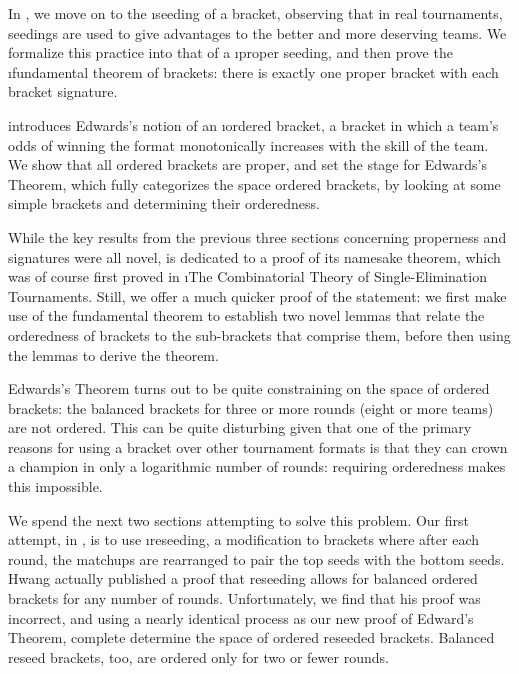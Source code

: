 {    In , we move on to the \i{seeding} of a bracket, observing that in real tournaments, seedings are used to give advantages to the better and more deserving teams. We formalize this practice into that of a \i{proper seeding}, and then prove the \i{fundamental theorem of brackets}: there is exactly one proper bracket with each bracket signature.

     introduces Edwards's \cite{montana} notion of an \i{ordered bracket}, a bracket in which a team's odds of winning the format monotonically increases with the skill of the team. We show that all ordered brackets are proper, and set the stage for Edwards's Theorem, which fully categorizes the space ordered brackets, by looking at some simple brackets and determining their orderedness.

    While the key results from the previous three sections concerning properness and signatures were all novel,  is dedicated to a proof of its namesake theorem, which was of course first proved in \i{The Combinatorial Theory of Single-Elimination Tournaments}. Still, we offer a much quicker proof of the statement: we first make use of the fundamental theorem to establish two novel lemmas that relate the orderedness of brackets to the sub-brackets that comprise them, before then using the lemmas to derive the theorem.

    Edwards's Theorem turns out to be quite constraining on the space of ordered brackets: the balanced brackets for three or more rounds (eight or more teams) are not ordered. This can be quite disturbing given that one of the primary reasons for using a bracket over other tournament formats is that they can crown a champion in only a logarithmic number of rounds: requiring orderedness makes this impossible. 

    We spend the next two sections attempting to solve this problem. Our first attempt, in , is to use \i{reseeding}, a modification to brackets where after each round, the matchups are rearranged to pair the top seeds with the bottom seeds. Hwang \cite{reseeding} actually published a proof that reseeding allows for balanced ordered brackets for any number of rounds. Unfortunately, we find that his proof was incorrect, and using a nearly identical process as our new proof of Edward's Theorem, complete determine the space of ordered reseeded brackets. Balanced reseed brackets, too, are ordered only for two or fewer rounds.

}
